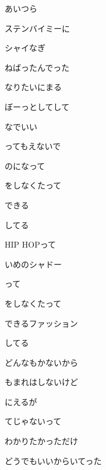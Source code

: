 \documentclass[a4paper,tate,twocolumn,12pt]{ltjtarticle}
\begin{document}
\begin{flushleft}
\begin{minipage}{\linewidth}
あいつら

ステンバイミーに

シャイなぎ

ねばったんでった

なりたいにまる

ぼーっとしてして

なでいい
\end{minipage}

\vspace{2em}

\noindent\begin{minipage}{\linewidth}
ってもえないで

のになって

をしなくたって

できる

してる

HIP HOPって

いめのシャドー

って

をしなくたって

できるファッション

してる
\end{minipage}

\vspace{2em}

\noindent\begin{minipage}{\linewidth}
どんなもかないから

もまれはしないけど

にえるが

てじゃないって

わかりたかっただけ
\end{minipage}

\vspace{2em}

\noindent\begin{minipage}{\linewidth}
どうでもいいからいてった


\end{minipage}
\end{flushleft}
\end{document}

